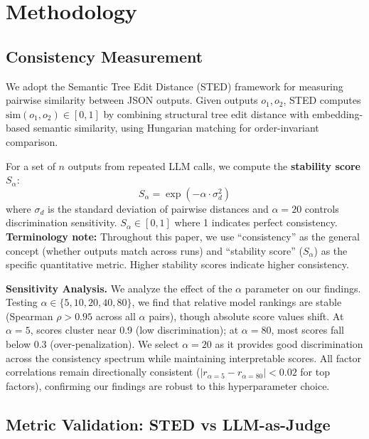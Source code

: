 \documentclass[sigconf,anonymous,review]{acmart}
\begin{document}
\section{Methodology}
\label{sec:method}

\subsection{Consistency Measurement}

We adopt the Semantic Tree Edit Distance (STED) framework for measuring pairwise similarity between JSON outputs. Given outputs $o_1, o_2$, STED computes $\text{sim}(o_1, o_2) \in [0, 1]$ by combining structural tree edit distance with embedding-based semantic similarity, using Hungarian matching for order-invariant comparison.

For a set of $n$ outputs from repeated LLM calls, we compute the \textbf{stability score} $S_\alpha$:
\begin{equation}
S_\alpha = \exp\left(-\alpha \cdot \sigma_d^2\right)
\end{equation}
where $\sigma_d$ is the standard deviation of pairwise distances and $\alpha=20$ controls discrimination sensitivity. $S_\alpha \in [0,1]$ where 1 indicates perfect consistency. \textbf{Terminology note:} Throughout this paper, we use ``consistency'' as the general concept (whether outputs match across runs) and ``stability score'' ($S_\alpha$) as the specific quantitative metric. Higher stability scores indicate higher consistency.

\textbf{Sensitivity Analysis.} We analyze the effect of the $\alpha$ parameter on our findings. Testing $\alpha \in \{5, 10, 20, 40, 80\}$, we find that relative model rankings are stable (Spearman $\rho > 0.95$ across all $\alpha$ pairs), though absolute score values shift. At $\alpha=5$, scores cluster near 0.9 (low discrimination); at $\alpha=80$, most scores fall below 0.3 (over-penalization). We select $\alpha=20$ as it provides good discrimination across the consistency spectrum while maintaining interpretable scores. All factor correlations remain directionally consistent ($|r_{\alpha=5} - r_{\alpha=80}| < 0.02$ for top factors), confirming our findings are robust to this hyperparameter choice.

\subsection{Metric Validation: STED vs LLM-as-Judge}
\end{document}
